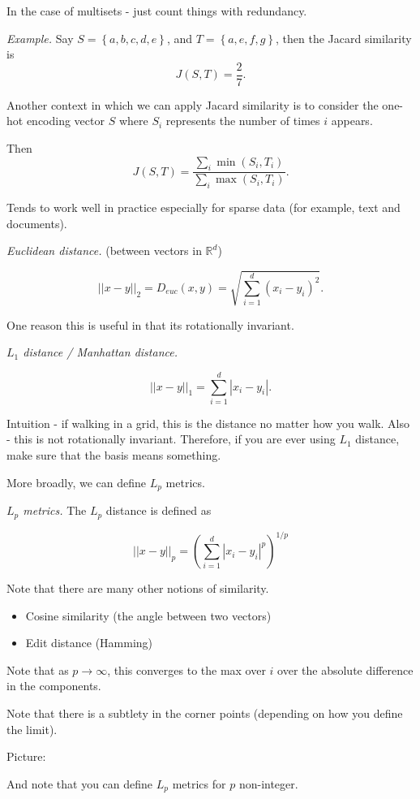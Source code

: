 \documentclass[12pt]{article}
\newcommand{\RR}{\mathbb{R}}
\begin{document}
In the case of multisets - just count things with redundancy.

{\it Example.} Say $S = \left\{ a, b, c, d, e \right\}$, and $T = \left\{ a, e, f, g \right\}$, then the Jacard similarity is
\[
  J(S, T) = \frac{2}{7}.
\]

Another context in which we can apply Jacard similarity is to consider the one-hot encoding vector $S$ where $S_i$ represents the number of times $i$ appears.

Then
\[
  J(S, T) = \frac{\sum_{i} \min(S_i, T_i)}{\sum_{i} \max (S_i, T_i)}.
\]

Tends to work well in practice especially for sparse data (for example, text and documents).

{\it Euclidean distance.} (between vectors in $\RR^d$)

\[
  ||x-y||_2 = D_{euc} (x, y) = \sqrt{\sum_{i=1}^{d} (x_i - y_i)^2}.
\]

One reason this is useful in that its rotationally invariant.

{\it $L_1$ distance / Manhattan distance.} 

\[
  ||x - y||_1 = \sum_{i=1}^{d} |x_i - y_i|.
\]

Intuition - if walking in a grid, this is the distance no matter how you walk.  Also - this is not rotationally invariant.  Therefore, if you are ever using $L_1$ distance, make sure that the basis means something.

More broadly, we can define $L_p$ metrics.

{\it $L_p$ metrics.} The $L_p$ distance is defined as

\[
  ||x - y||_p = \left ( \sum_{i=1}^{d} |x_i - y_i|^{p} \right )^{1/p}
\]

Note that there are many other notions of similarity.  

\begin{itemize}
  \item Cosine similarity (the angle between two vectors)
  \item Edit distance (Hamming)
\end{itemize}

Note that as $p \to \infty$, this converges to the max over $i$ over the absolute difference in the components.

Note that there is a subtlety in the corner points (depending on how you define the limit).

Picture:

And note that you can define $L_p$ metrics for $p$ non-integer.
\end{document}
